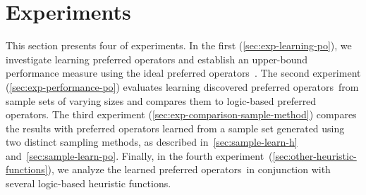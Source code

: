 \documentclass[ppgc,diss,english]{iiufrgs}
\begin{document}

%
%
\chapter{Experiments}
\label{cha:exp-experiments}
This section presents four of experiments. In the first (\cref{sec:exp-learning-po}), we investigate learning preferred operators and establish an upper-bound performance measure using the ideal preferred operators~\postar. The second experiment (\cref{sec:exp-performance-po}) evaluates learning discovered preferred operators~\pog from sample sets of varying sizes and compares them to logic-based preferred operators. The third experiment (\cref{sec:exp-comparison-sample-method}) compares the results with preferred operators learned from a sample set generated using two distinct sampling methods, as described in~\cref{sec:sample-learn-h} and~\cref{sec:sample-learn-po}. Finally, in the fourth experiment~(\cref{sec:other-heuristic-functions}), we analyze the learned preferred operators~\pog in conjunction with several logic-based heuristic functions.
\end{document}
